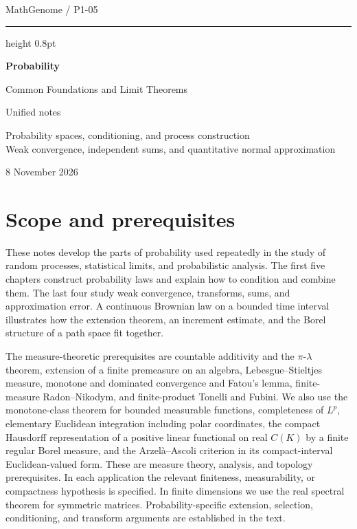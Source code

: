 \documentclass[11pt,oneside,openany]{book}
\theoremstyle{plain}
\theoremstyle{definition}
\theoremstyle{remark}
\begin{document}
\frontmatter
\hypersetup{pageanchor=false}
\begin{titlepage}
\thispagestyle{empty}
\vspace*{32mm}
{\large MathGenome \enspace / \enspace P1-05\par}
\vspace{7mm}
\hrule height 0.8pt
\vspace{11mm}
{\Huge\bfseries Probability\par}
\vspace{4mm}
{\LARGE Common Foundations and Limit Theorems\par}
\vspace{15mm}
{\large Unified notes\par}
\vspace{3mm}
{\normalsize Probability spaces, conditioning, and process construction\\
Weak convergence, independent sums, and quantitative normal approximation\par}
\vfill
{\large 8 November 2026\par}
\end{titlepage}
\hypersetup{pageanchor=true}
\tableofcontents

\chapter*{Scope and prerequisites}

These notes develop the parts of probability used repeatedly in the study of
random processes, statistical limits, and probabilistic analysis. The first five
chapters construct probability laws and explain how to condition and combine them.
The last four study weak convergence, transforms, sums, and approximation error.
A continuous Brownian law on a bounded time interval illustrates how the
extension theorem, an increment estimate, and the Borel structure of a path
space fit together.

The measure-theoretic prerequisites are countable additivity and the
\(\pi\)-\(\lambda\) theorem, extension of a finite premeasure on an algebra,
Lebesgue--Stieltjes measure, monotone and dominated convergence and Fatou's
lemma, finite-measure Radon--Nikodym, and finite-product Tonelli and Fubini.
We also use the monotone-class theorem for bounded measurable functions,
completeness of \(L^p\), elementary Euclidean integration including
polar coordinates, the compact
Hausdorff representation of a positive linear functional on real \(C(K)\)
by a finite regular Borel measure, and the Arzel\`a--Ascoli criterion in its
compact-interval Euclidean-valued form. These are measure theory, analysis,
and topology prerequisites. In each application the relevant finiteness,
measurability, or compactness hypothesis is specified. In finite dimensions
we use the real spectral theorem for symmetric matrices.
Probability-specific extension, selection, conditioning,
and transform arguments are established in the text.
\end{document}
